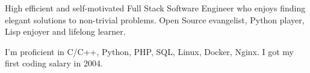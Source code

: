 
\begin{cvparagraph}

High efficient and self-motivated Full Stack Software Engineer who enjoys finding
elegant solutions to non-trivial problems. Open Source evangelist, Python player,
Lisp enjoyer and lifelong learner.

I'm proficient in C/C++, Python, PHP, SQL, Linux, Docker, Nginx. I got my first coding salary in 2004.

\end{cvparagraph}
